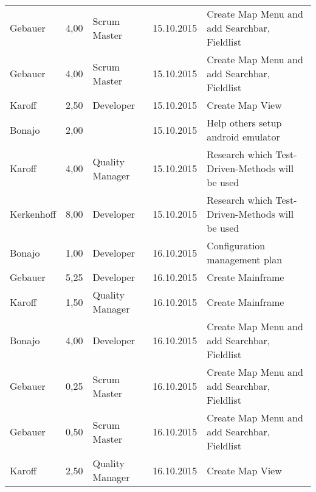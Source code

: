 \begin{longtable}{ l r p{2cm} c p{4cm} }
		Gebauer                 & 4,00           & Scrum Master          & 15.10.2015    & Create Map Menu and add Searchbar, Fieldlist                                    \\
		Gebauer                 & 4,00           & Scrum Master          & 15.10.2015    & Create Map Menu and add Searchbar, Fieldlist                                    \\
		Karoff                  & 2,50           & Developer             & 15.10.2015    & Create Map View                                                                 \\
		Bonajo                  & 2,00           &                       & 15.10.2015    & Help others setup android emulator                                              \\
		Karoff                  & 4,00           & Quality Manager       & 15.10.2015    & Research which Test-Driven-Methods will be used                                 \\
		Kerkenhoff              & 8,00           & Developer             & 15.10.2015    & Research which Test-Driven-Methods will be used                                 \\
		Bonajo                  & 1,00           & Developer             & 16.10.2015    & Configuration management plan                                                   \\
		Gebauer                 & 5,25           & Developer             & 16.10.2015    & Create Mainframe                                                                \\
		Karoff                  & 1,50           & Quality Manager       & 16.10.2015    & Create Mainframe                                                                \\
		Bonajo                  & 4,00           & Developer             & 16.10.2015    & Create Map Menu and add Searchbar, Fieldlist                                    \\
		Gebauer                 & 0,25           & Scrum Master          & 16.10.2015    & Create Map Menu and add Searchbar, Fieldlist                                    \\
		Gebauer                 & 0,50           & Scrum Master          & 16.10.2015    & Create Map Menu and add Searchbar, Fieldlist                                    \\
		Karoff                  & 2,50           & Quality Manager       & 16.10.2015    & Create Map View                                                                 \\

\end{longtable}
